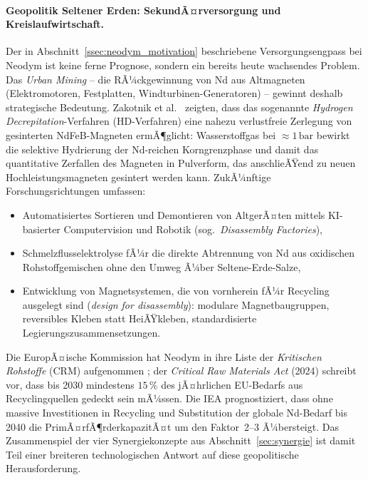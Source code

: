 ﻿\documentclass[12pt, a4paper]{report}
\theoremstyle{definition}
\theoremstyle{remark}
\begin{document}
\paragraph{Geopolitik Seltener Erden: SekundÃ¤rversorgung und Kreislaufwirtschaft.}
Der in Abschnitt~\ref{ssec:neodym_motivation} beschriebene Versorgungsengpass
bei Neodym ist keine ferne Prognose, sondern ein bereits heute wachsendes Problem.
Das \emph{Urban Mining} -- die RÃ¼ckgewinnung von Nd aus Altmagneten
(Elektromotoren, Festplatten, Windturbinen-Generatoren) -- gewinnt deshalb
strategische Bedeutung. Zakotnik et al.~\cite{zakotnik2009} zeigten,
dass das sogenannte \emph{Hydrogen Decrepitation}-Verfahren (HD-Verfahren) eine
nahezu verlustfreie Zerlegung von gesinterten NdFeB-Magneten ermÃ¶glicht: Wasserstoffgas
bei $\approx 1\,\text{bar}$ bewirkt die selektive Hydrierung der Nd-reichen
Korngrenzphase und damit das quantitative Zerfallen des Magneten in Pulverform,
das anschlieÃŸend zu neuen Hochleistungsmagneten gesintert werden kann. ZukÃ¼nftige
Forschungsrichtungen umfassen:
\begin{itemize}
  \item Automatisiertes Sortieren und Demontieren von AltgerÃ¤ten mittels
        KI-basierter Computervision und Robotik (sog.\ \emph{Disassembly Factories}),
  \item Schmelzflusselektrolyse fÃ¼r die direkte Abtrennung von Nd aus oxidischen
        Rohstoffgemischen ohne den Umweg Ã¼ber Seltene-Erde-Salze,
  \item Entwicklung von Magnetsystemen, die von vornherein fÃ¼r Recycling ausgelegt
        sind (\emph{design for disassembly}): modulare Magnetbaugruppen, reversibles
        Kleben statt HeiÃŸkleben, standardisierte Legierungszusammensetzungen.
\end{itemize}
Die EuropÃ¤ische Kommission hat Neodym in ihre Liste der \emph{Kritischen Rohstoffe}
(CRM) aufgenommen \cite{eu2023}; der \emph{Critical Raw Materials Act} (2024)
schreibt vor, dass bis 2030 mindestens $15\,\%$ des jÃ¤hrlichen EU-Bedarfs aus
Recyclingquellen gedeckt sein mÃ¼ssen. Die IEA \cite{iea2024} prognostiziert, dass
ohne massive Investitionen in Recycling und Substitution der globale Nd-Bedarf bis
2040 die PrimÃ¤rfÃ¶rderkapazitÃ¤t um den Faktor~2--3 Ã¼bersteigt. Das Zusammenspiel der
vier Synergiekonzepte aus Abschnitt~\ref{sec:synergie} ist damit Teil einer
breiteren technologischen Antwort auf diese geopolitische Herausforderung.
\end{document}
